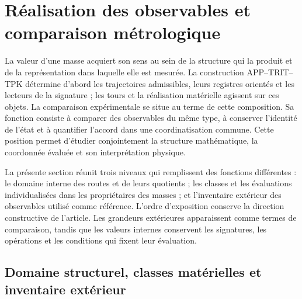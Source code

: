 
\section{Réalisation des observables et comparaison métrologique
}
\label{sec:vi-contraste-metrologico}

La valeur d’une masse acquiert son sens au sein de la structure qui la
produit et de la représentation dans laquelle elle est mesurée. La construction
APP--TRIT--TPK détermine d’abord les trajectoires admissibles, leurs registres
orientés et les lecteurs de la signature ; les tours et la réalisation matérielle
agissent sur ces objets. La comparaison expérimentale se situe au terme de
cette composition. Sa fonction consiste à comparer des observables du même
type, à conserver l’identité de l’état et à quantifier l’accord dans une
coordinatisation commune. Cette position permet d’étudier conjointement la structure
mathématique, la coordonnée évaluée et son interprétation physique.


La présente section réunit trois niveaux qui remplissent des fonctions différentes :
le domaine interne des routes et de leurs quotients ; les classes et les évaluations
individualisées dans les propriétaires des masses ; et l’inventaire extérieur des
observables utilisé comme référence. L’ordre d’exposition conserve la
direction constructive de l’article. Les grandeurs extérieures apparaissent comme
termes de comparaison, tandis que les valeurs internes conservent les signatures,
les opérations et les conditions qui fixent leur évaluation.


\subsection{Domaine structurel, classes matérielles et inventaire extérieur
}
\label{subsec:vi-dominios-contraste}

